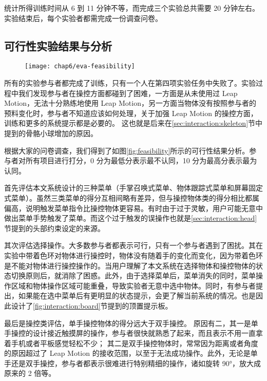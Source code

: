 统计所得训练时间从 6 到 11 分钟不等，而完成三个实验总共需要 20 分钟左右。实验结束后，每个实验者都需完成一份调查问卷。

\subsection{可行性实验结果与分析}
\label{subsec:exp:feasibility}

\begin{figure}[!htp]
  \centering
  \texttt{[image: chap6/eva-feasibility]}
\end{figure}

所有的实验参与者都完成了训练，只有一个人在第四项实验任务中失败了。实验过程中我们发现参与者在操控方面都碰到了困难，一方面是从未使用过 Leap Motion，无法十分熟练地使用 Leap Motion，另一方面当物体没有按照参与者的预料变化时，参与者不知道应该如何处理，关于加强 Leap Motion 的操控方面，训练和更多的系统提示都是必要的。
这也就是后来在\ref{sec:interaction:skeleton}节中提到的骨骼小球增加的原因。

根据大家的问卷调查，我们得到了如图\ref{fig:feasibility}所示的可行性结果分析。参与者对所有项目进行打分，0 分为最低分表示最不认同，10 分为最高分表示最为认同。

首先评估本文系统设计的三种菜单（手掌召唤式菜单、物体跟踪式菜单和屏幕固定式菜单）。虽然三类菜单的得分互相间略有差异，但与操控物体类的得分相比都属偏高，说明触发菜单指令比操控物体更容易。有时由于过于灵敏，用户可能无意中做出菜单手势触发了菜单。而这个过于触发的误操作也就是\ref{sec:interaction:head}节提到的头部约束设定的来源。

其次评估选择操作。大多数参与者都表示可行，只有一个参与者遇到了困扰。其在实验中带着色环对物体进行操控时，物体没有随着手的变化而变化，因为带着色环是不能对物体进行操控操作的。当用户理解了本文系统在选择物体和操控物体的状态切换原则后，就消除了困惑。此外，由于选择菜单后，菜单消失的同时，菜单操作区域和物体操作区域可能重叠，导致实验者无意中选中物体。同时，有参与者提出，如果能在选中菜单后有更明显的状态提示，会更了解当前系统的情况。也是因此设计了\ref{fig:interaction:board}节提到的顶置提示板。

最后是操控类评估，单手操控物体的得分远大于双手操控。
原因有二，其一是单手操控的设计接近触摸屏的操作，参与者很快就熟悉了起来，而且表示不用一直拿着手机或者平板感觉轻松不少；
其二是双手操控物体时，常常因为距离或者角度的原因超过了 Leap Motion 的接收范围，以至于无法成功操作。此外，无论是单手还是双手操控，参与者都表示很难进行特别精细的操作，诸如旋转 90°，放大成原来的 2 倍等。


